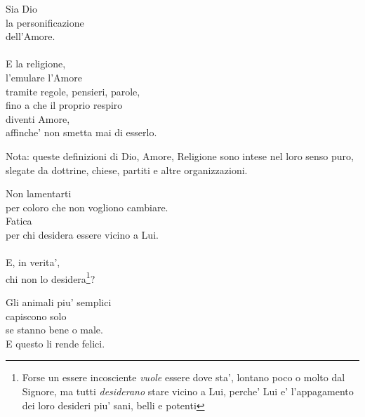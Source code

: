 \begin{haiku}
    Sia Dio\\
    la personificazione\\
    dell'Amore.\\
    \leavevmode\\
    E la religione,\\
    l'emulare l'Amore\\
    tramite regole, pensieri, parole,\\
    fino a che il proprio respiro\\
    diventi Amore,\\
    affinche' non smetta mai di esserlo.\\
\end{haiku}

\small{Nota: queste definizioni di Dio, Amore, Religione sono intese nel loro senso puro, slegate da dottrine, chiese, partiti e altre organizzazioni.}


\begin{haiku}
    Non lamentarti\\
    per coloro che non vogliono cambiare.\\
    Fatica\\
    per chi desidera essere vicino a Lui.\\
    \leavevmode\\
    E, in verita',\\
    chi non lo desidera\footnote{Forse un essere incosciente \emph{vuole} essere dove sta', lontano poco o molto dal Signore, ma tutti \emph{desiderano} stare vicino a Lui, perche' Lui e' l'appagamento dei loro desideri piu' sani, belli e potenti}?\\
\end{haiku}

\begin{haiku}
    Gli animali piu' semplici\\
    capiscono solo\\
    se stanno bene o male.\\
    E questo li rende felici.\\
\end{haiku}

